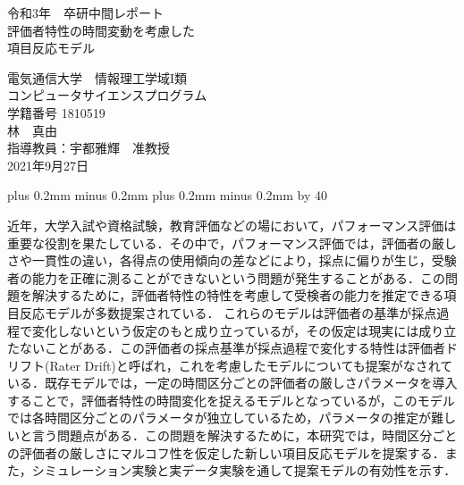 \documentclass[a4paper,11pt,oneside,openany]{jsbook}
\def\kcharparline#1{%
   \ifx\xkanjiskip\undefined%
   \jintercharskip 0mm plus 0.2mm minus 0.2mm
   \else
   \xkanjiskip 0mm plus 0.2mm minus 0.2mm
   \fi
   \settowidth{\textwidth}{}%
   \multiply\textwidth by #1}
\begin{document}
\begin{titlepage}

\begin{center}
{\Large 令和3年　卒研中間レポート}\\ %
\vspace*{150truept}
{\huge 評価者特性の時間変動を考慮した\\項目反応モデル}\\ %
\vspace{120truept}

{\huge 電気通信大学　情報理工学域I類}\\ %
\vspace{10truept}
{\huge コンピュータサイエンスプログラム}\\ %
\vspace{10truept}
{\huge 学籍番号 1810519}\\ %
\vspace{50truept}
{\huge 林　真由}\\ %
\vspace{50truept}
{\huge 指導教員：宇都雅輝　准教授}\\
\vspace{50truept}
{\huge 2021年9月27日}\\ %
\end{center}
\end{titlepage}
\kcharparline{40} %

\frontmatter
近年，大学入試や資格試験，教育評価などの場において，パフォーマンス評価は重要な役割を果たしている．その中で，パフォーマンス評価では，評価者の厳しさや一貫性の違い，各得点の使用傾向の差などにより，採点に偏りが生じ，受験者の能力を正確に測ることができないという問題が発生することがある．この問題を解決するために，評価者特性の特性を考慮して受検者の能力を推定できる項目反応モデルが多数提案されている．
これらのモデルは評価者の基準が採点過程で変化しないという仮定のもと成り立っているが，その仮定は現実には成り立たないことがある．この評価者の採点基準が採点過程で変化する特性は評価者ドリフト(Rater Drift)と呼ばれ，これを考慮したモデルについても提案がなされている．既存モデルでは，一定の時間区分ごとの評価者の厳しさパラメータを導入することで，評価者特性の時間変化を捉えるモデルとなっているが，このモデルでは各時間区分ごとのパラメータが独立しているため，パラメータの推定が難しいと言う問題点がある．この問題を解決するために，本研究では，時間区分ごとの評価者の厳しさにマルコフ性を仮定した新しい項目反応モデルを提案する．また，シミュレーション実験と実データ実験を通して提案モデルの有効性を示す．
\tableofcontents
%
%
\mainmatter
\end{document}
